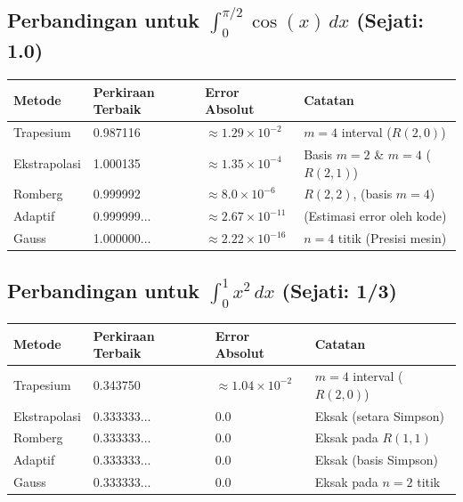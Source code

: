 \documentclass[a4paper, 11pt]{article} %
\begin{document}
\subsection{Perbandingan untuk $\int_0^{\pi/2} \cos(x) \, dx$ (Sejati: 1.0)} %

\begin{table}[H] %
\centering %
\begin{tabular}{l l l l} %
\toprule %
Metode & Perkiraan Terbaik & Error Absolut & Catatan \\ %
\midrule %
Trapesium & 0.987116 & $\approx 1.29 \times 10^{-2}$ & $m=4$ interval ($R(2,0)$) \\ %
Ekstrapolasi & 1.000135 & $\approx 1.35 \times 10^{-4}$ & Basis $m=2$ \& $m=4$ ($R(2,1)$) \\ %
Romberg & 0.999992 & $\approx 8.0 \times 10^{-6}$ & $R(2,2)$, (basis $m=4$) \\ %
Adaptif & 0.999999... & $\approx 2.67 \times 10^{-11}$ & (Estimasi error oleh kode) \\ %
Gauss & 1.000000... & $\approx 2.22 \times 10^{-16}$ & $n=4$ titik (Presisi mesin) \\ %
\bottomrule %
\end{tabular} %
\end{table} %

\subsection{Perbandingan untuk $\int_0^1 x^2 \, dx$ (Sejati: 1/3)} %

\begin{table}[H] %
\centering %
\begin{tabular}{l l l l} %
\toprule %
Metode %
& Perkiraan Terbaik & Error Absolut & Catatan \\ %
\midrule %
Trapesium & 0.343750 & $\approx 1.04 \times 10^{-2}$ & $m=4$ interval ($R(2,0)$) \\ %
Ekstrapolasi & 0.333333... & 0.0 & Eksak (setara Simpson) \\ %
Romberg & 0.333333... & 0.0 & Eksak pada $R(1,1)$ \\ %
Adaptif & 0.333333... & 0.0 & Eksak (basis Simpson) \\ %
Gauss & 0.333333... & 0.0 & Eksak pada $n=2$ titik \\ %
\bottomrule %
\end{tabular} %
\end{table} %
\end{document}
